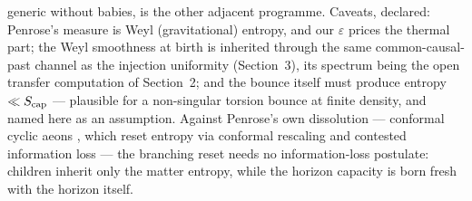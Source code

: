 \documentclass[11pt]{article}
\begin{document}
generic without babies, is the other adjacent programme. Caveats, declared: Penrose's measure is Weyl (gravitational) entropy, and our $\varepsilon$ prices the thermal part; the Weyl smoothness at birth is inherited through the same common-causal-past channel as the injection uniformity (Section~3), its spectrum being the open transfer computation of Section~2; and the bounce itself must produce entropy $\ll S_{\rm cap}$ --- plausible for a non-singular torsion bounce at finite density, and named here as an assumption. Against Penrose's own dissolution --- conformal cyclic aeons \cite{PenroseCCC}, which reset entropy via conformal rescaling and contested information loss --- the branching reset needs no information-loss postulate: children inherit only the matter entropy, while the horizon capacity is born fresh with the horizon itself.
\end{document}
